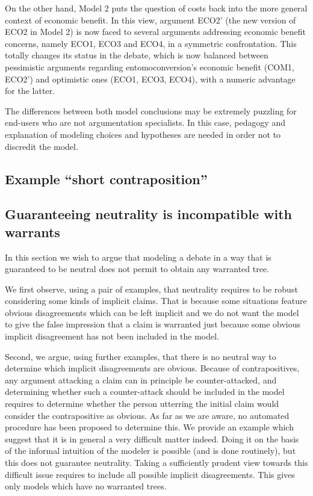 \documentclass[version=3.21, pagesize, twoside=off, bibliography=totoc, DIV=calc, fontsize=12pt, a4paper, french, english]{scrartcl}
\begin{document}
On the other hand, Model 2 puts the question of costs back into the more general context of economic benefit. In this view, argument ECO2' (the new version of ECO2 in Model 2) is now faced to several arguments addressing economic benefit concerns, namely ECO1, ECO3 and ECO4, in a symmetric confrontation. This totally changes its status in the debate, which is now balanced between pessimistic arguments regarding entomoconversion's economic benefit (COM1, ECO2') and optimistic ones (ECO1, ECO3, ECO4), with a numeric advantage for the latter.

The differences between both model conclusions may be extremely puzzling for end-users who are not argumentation specialists. In this case, pedagogy and explanation of modeling choices and hypotheses are needed in order not to discredit the model.

\subsection{Example “short contraposition”}

\subsection{Guaranteeing neutrality is incompatible with warrants}
In this section we wish to argue that modeling a debate in a way that is guaranteed to be neutral does not permit to obtain any warranted tree. 

We first observe, using a pair of examples, that neutrality requires to be robust considering some kinds of implicit claims. That is because some situations feature obvious disagreements which can be left implicit and we do not want the model to give the false impression that a claim is warranted just because some obvious implicit disagreement has not been included in the model.

Second, we argue, using further examples, that there is no neutral way to determine which implicit disagreements are obvious. Because of contrapositives, any argument attacking a claim can in principle be counter-attacked, and determining whether such a counter-attack should be included in the model requires to determine whether the person utterring the initial claim would consider the contrapositive as obvious. As far as we are aware, no automated procedure has been proposed to determine this. We provide an example which suggest that it is in general a very difficult matter indeed. Doing it on the basis of the informal intuition of the modeler is possible (and is done routinely), but this does not guarantee neutrality. Taking a sufficiently prudent view towards this difficult issue requires to include all possible implicit disagreements. This gives only models which have no warranted trees.
\end{document}
